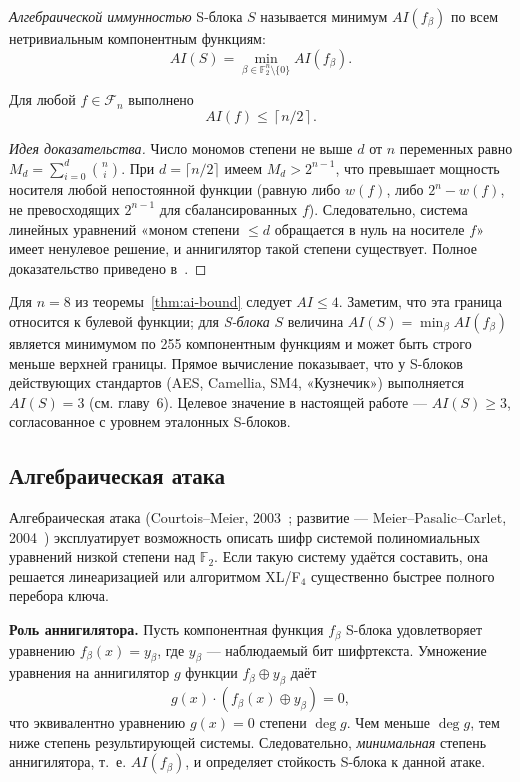 \begin{definition}
\emph{Алгебраической иммунностью} S-блока $S$ называется минимум
$AI(f_\beta)$ по всем нетривиальным компонентным функциям:
\[
    AI(S) = \min_{\beta \in \mathbb{F}_2^n \setminus \{0\}} AI(f_\beta).
\]
\end{definition}

\begin{theorem}
\label{thm:ai-bound}
Для любой $f \in \mathcal{F}_n$ выполнено
\[
    AI(f) \leq \left\lceil n/2 \right\rceil.
\]
\end{theorem}

\begin{proof}[Идея доказательства]
Число мономов степени не выше $d$ от $n$ переменных равно
$M_d = \sum_{i=0}^{d} \binom{n}{i}$. При $d = \lceil n/2 \rceil$ имеем
$M_d > 2^{n-1}$, что превышает мощность носителя любой непостоянной
функции (равную либо $w(f)$, либо $2^n - w(f)$, не превосходящих
$2^{n-1}$ для сбалансированных $f$). Следовательно, система линейных
уравнений «моном степени $\leq d$ обращается в нуль на носителе $f$»
имеет ненулевое решение, и аннигилятор такой степени существует.
Полное доказательство приведено в~\cite{meier2004algebraic,carlet2021book}.
\end{proof}

Для $n = 8$ из теоремы~\ref{thm:ai-bound} следует $AI \leq 4$.
Заметим, что эта граница относится к булевой функции; для
\emph{S-блока} $S$ величина $AI(S) = \min_\beta AI(f_\beta)$
является минимумом по 255 компонентным функциям и может быть
строго меньше верхней границы. Прямое вычисление показывает, что
у S-блоков действующих стандартов (AES, Camellia, SM4, «Кузнечик»)
выполняется $AI(S) = 3$ (см. главу~6). Целевое значение в
настоящей работе — $AI(S) \geq 3$, согласованное с уровнем
эталонных S-блоков.

\subsection{Алгебраическая атака}

Алгебраическая атака (Courtois–Meier, 2003~\cite{courtois2003algebraic};
развитие — Meier–Pasalic–Carlet, 2004~\cite{meier2004algebraic})
эксплуатирует возможность описать шифр системой полиномиальных
уравнений низкой степени над $\mathbb{F}_2$. Если такую систему удаётся
составить, она решается линеаризацией или алгоритмом
XL/F$_4$ существенно быстрее полного перебора ключа.

\textbf{Роль аннигилятора.} Пусть компонентная функция $f_\beta$
S-блока удовлетворяет уравнению $f_\beta(x) = y_\beta$, где $y_\beta$ —
наблюдаемый бит шифртекста. Умножение уравнения на аннигилятор $g$
функции $f_\beta \oplus y_\beta$ даёт
\[
    g(x) \cdot (f_\beta(x) \oplus y_\beta) = 0,
\]
что эквивалентно уравнению $g(x) = 0$ степени $\deg g$. Чем меньше
$\deg g$, тем ниже степень результирующей системы. Следовательно,
\emph{минимальная} степень аннигилятора, т.~е. $AI(f_\beta)$, и
определяет стойкость S-блока к данной атаке.

